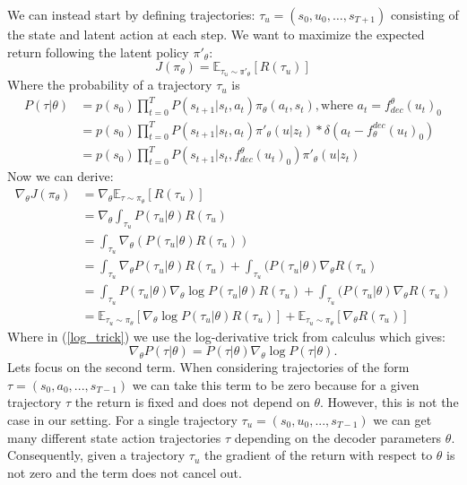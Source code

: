\documentclass{article}
\begin{document}
We can instead start by defining trajectories: $\tau_{u} = (s_0,u_0,\dots,s_{T+1})$ consisting of the state and latent action at each step. 
We want to maximize the expected return following the latent policy $\pi'_\theta$:
\begin{equation}
J(\pi_\theta) = \mathbb{E_{\tau_u \sim \pi'_\theta} }[R(\tau_u)]
\end{equation}
Where the probability of a trajectory $\tau_u$ is 
\begin{equation}
\begin{aligned}
P(\tau|\theta) &= p(s_0)\prod_{t=0}^TP(s_{t+1}|s_t,a_t)\pi_\theta(a_t,s_t), \text{where }a_t= f^\theta_{dec}(u_t)_0 \\&= p(s_0)\prod_{t=0}^TP(s_{t+1}|s_t,a_t) \pi'_{\theta}(u|z_t)*\delta(a_t-f^{dec}_\theta(u_t)_0) \\&= p(s_0) \prod_{t=0}^TP(s_{t+1}|s_t,f_{dec}^\theta(u_t)_0)\pi'_\theta (u|z_t)
\end{aligned}
\end{equation}
Now we can derive:
\begin{align}
\nabla_\theta J(\pi_\theta) &= \nabla_\theta \mathbb{E}_{\tau\sim\pi_\theta}[R(\tau_u)]
\\ &= \nabla_\theta\int_{\tau_u}P(\tau_u|\theta)R(\tau_u)
\\ &=\int_{\tau_u}\nabla_\theta( P(\tau_u|\theta)R(\tau_u))
\\ &=\int_{\tau_u}\nabla_\theta P(\tau_u|\theta)R(\tau_u)+\int_{\tau_u}(P(\tau_u|\theta)\nabla_\theta R(\tau_u)
\\\label{log_trick}&=\int_{\tau_u}P(\tau_u|\theta)\nabla_\theta \log P(\tau_u|\theta)R(\tau_u)+\int_{\tau_u}(P(\tau_u|\theta)\nabla_\theta R(\tau_u)
\\&= \mathbb{E}_{\tau_u\sim\pi_\theta}[\nabla_\theta \log P(\tau_u|\theta)R(\tau_u)] +\mathbb{E}_{\tau_u\sim\pi_\theta}[\nabla_\theta R(\tau_u)]\label{expectation_sum}
\end{align}
Where in (\ref{log_trick})  we use the log-derivative trick from calculus which gives:
\[
\nabla_{\theta} P(\tau|\theta) = P(\tau|\theta) \nabla_{\theta} \log P(\tau|\theta).
\]
Lets focus on the second term. When considering trajectories of the form $\tau =(s_0,a_0,...,s_{T-1})$ we can take this term to be zero because for a given trajectory $\tau$ the return is fixed and does not depend on $\theta$. However, this is not the case in our setting. For a single trajectory $\tau_u = (s_0,u_0,...,s_{T-1})$ we can get many different state action trajectories $\tau$ depending on the decoder parameters $\theta$. Consequently, given a trajectory $\tau_u$ the gradient of the return with respect to $\theta$ is not zero and the term does not cancel out. 
\end{document}
